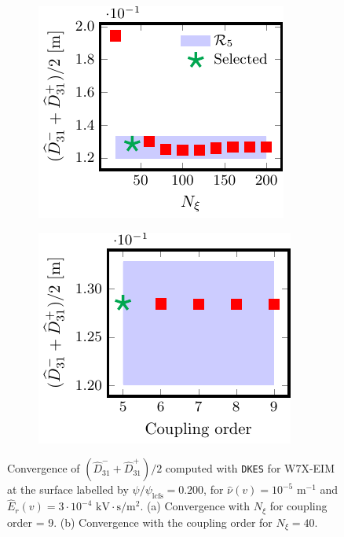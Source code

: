 \documentclass[10pt]{iopart}
\newcommand{\DKES}{{\texttt{DKES}}}
\begin{document}
\begin{figure}[t]
	\centering
	\begin{subfigure}[t]{0.32\textwidth}
		\includegraphics{DKES-Convergence-Legendre-W7X-EIM-s0200-Er-3e-4-D31-Detail}
%		
		\caption{}
		\label{subfig:DKES_D31_convergence_Legendre_W7X_EIM_0200_Erho_3e-4_Detail}
	\end{subfigure}
	\begin{subfigure}[t]{0.32\textwidth}
		\includegraphics{DKES-Convergence-theta-zeta-W7X-EIM-s0200-Er-3e-4-D31}
		\caption{}
		\label{subfig:DKES_D31_convergence_Coupling_parameter_W7X_EIM_0200_Erho_3e-4}
	\end{subfigure}
	
	\caption{Convergence of $(\widehat{D}_{31}^- + \widehat{D}_{31}^+) /2$ computed with {\DKES} for W7X-EIM at the surface labelled by $\psi/\psi_{\text{lcfs}}=0.200$, for $\hat{\nu}(v)=10^{-5}$ $\text{m}^{-1}$ and $\widehat{E}_r(v)=3\cdot 10^{-4}$ $\text{kV}\cdot\text{s}/\text{m}^2$. (a) Convergence with $N_\xi$ for coupling order = 9. (b) Convergence with the coupling order for $N_\xi= 40$.}
	\label{fig:DKES_Convergence_W7X_EIM_Er_3e-4}
\end{figure}
\end{document}
